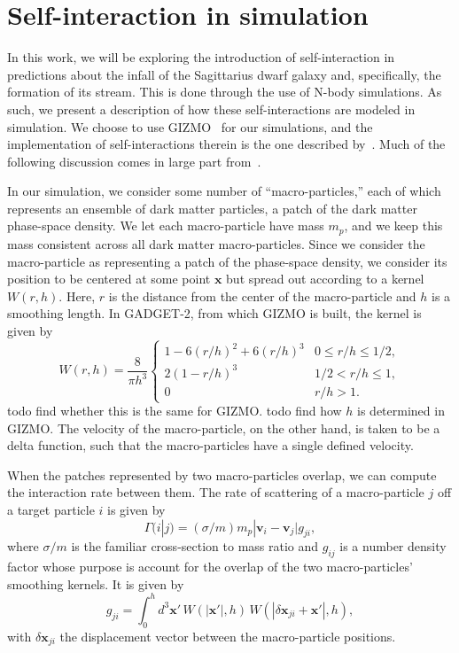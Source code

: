 \hypertarget{self-interaction-in-simulation}{%
\section{Self-interaction in simulation}\label{self-interaction-in-simulation}}

In this work, we will be exploring the introduction of self-interaction in
predictions about the infall of the Sagittarius dwarf galaxy and,
specifically, the formation of its stream. This is done through the use of
N-body simulations. As such, we present a description of how these
self-interactions are modeled in simulation. We choose to use
GIZMO~\cite{hopkins_new_2015} for our simulations, and the implementation of
self-interactions therein is the one described
by~\cite{rocha_cosmological_2013}. Much of the following discussion comes in
large part from~\cite{rocha_cosmological_2013}.

In our simulation, we consider some number of ``macro-particles,'' each
of which represents an ensemble of dark matter particles, a patch of the
dark matter phase-space density. We let each macro-particle have mass
\(m_p\), and we keep this mass consistent across all dark matter
macro-particles. Since we consider the macro-particle as representing a
patch of the phase-space density, we consider its position to be
centered at some point \(\mathbf{x}\) but spread out according to a
kernel \(W(r,h)\). Here, \(r\) is the distance from the center of the
macro-particle and \(h\) is a smoothing length. In GADGET-2, from which
GIZMO is built, the kernel is given by 
\begin{equation}
W(r,h) = \frac{8}{\pi h^3} \left\{ 
    \begin{array}{ll}
        1 - 6 (r/h)^2 + 6 (r/h)^3 & 0 \leq r/h \leq 1/2, \\
        2 (1 - r/h)^3 & 1/2 < r/h \leq 1, \\
        0 & r/h > 1.
    \end{array}
\right.
\end{equation}
todo find
whether this is the same for GIZMO. todo find how \(h\) is determined in
GIZMO. The velocity of the macro-particle, on the other hand, is taken
to be a delta function, such that the macro-particles have a single
defined velocity.

When the patches represented by two macro-particles overlap, we can
compute the interaction rate between them. The rate of scattering of a
macro-particle \(j\) off a target particle \(i\) is given by
\begin{equation}
\Gamma(i|j) = (\sigma/m) m_p |\mathbf{v}_i - \mathbf{v}_j| g_{ji},
\end{equation}
where \(\sigma/m\) is the familiar cross-section to mass ratio and
\(g_{ij}\) is a number density factor whose purpose is account for the
overlap of the two macro-particles' smoothing kernels. It is given by
\begin{equation}
g_{ji} = \int_{0}^{h} d^3 \mathbf{x}' \, W(|\mathbf{x}'|, h) \, 
W(|\delta \mathbf{x}_{ji} + \mathbf{x}'|, h),
\end{equation}
with \(\delta \mathbf{x}_{ji}\) the displacement vector between the
macro-particle positions.

